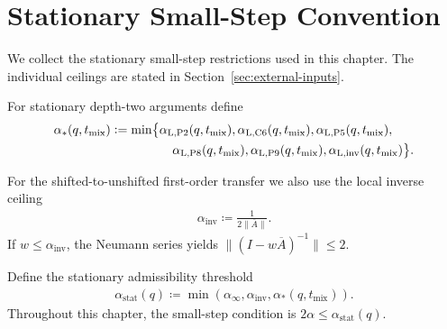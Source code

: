 
\section{Stationary Small-Step Convention}\label{sec:stationary-small-step}

We collect the stationary small-step restrictions used in this chapter. The
individual ceilings are stated in Section~\ref{sec:external-inputs}.

For stationary depth-two arguments define
\begin{equation}
\begin{aligned}
\alpha_*(q,t_{\text{mix}})
  &\coloneqq \min\bigl\{
    \alpha_{\text{L,P2}}(q,t_{\text{mix}}),
    \alpha_{\text{L,C6}}(q,t_{\text{mix}}),
    \alpha_{\text{L,P5}}(q,t_{\text{mix}}), \\
  &\hspace{4.9em}
    \alpha_{\text{L,P8}}(q,t_{\text{mix}}),
    \alpha_{\text{L,P9}}(q,t_{\text{mix}}),
    \alpha_{\text{L,inv}}(q,t_{\text{mix}})
  \bigr\}.
\end{aligned}
\label{eq:levin-stationary-threshold}
\end{equation}

For the shifted-to-unshifted first-order transfer we also use the local inverse
ceiling
\begin{equation}
\begin{aligned}
\alpha_{\text{inv}} \coloneqq \frac{1}{2 \lVert  \overline{A}  \rVert}.
\end{aligned}
\label{eq:alpha-inv}
\end{equation}
If \(w \le \alpha_{\text{inv}}\), the Neumann series yields
\(\lVert  (I - w \overline{A})^{-1}  \rVert \le 2\).

Define the stationary admissibility threshold
\begin{equation}
\begin{aligned}
\alpha_{\text{stat}}(q)
  \coloneqq \min (
    \alpha_\infty,
    \alpha_{\text{inv}},
    \alpha_*(q, t_{\text{mix}})
  ).
\end{aligned}
\label{eq:alpha-stationary-threshold}
\end{equation}
Throughout this chapter, the small-step condition is
\(2 \alpha \le \alpha_{\text{stat}}(q)\).
